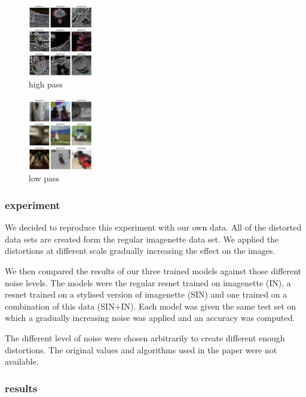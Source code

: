 \documentclass{article}
\begin{document}
\begin{figure}[h!]
\centering
\includegraphics[width = 0.25\textwidth]{imgs/image_high}
\caption{high pass}
\end{figure}

\begin{figure}[h!]
\centering
\includegraphics[width = 0.25\textwidth]{imgs/image_low}
\caption{low pass}

\end{figure}

\subsubsection{experiment}

We decided to reproduce this experiment with our own data.
All of the distorted data sets are created form the regular imagenette data set. We applied the distortions at different scale gradually increasing the effect on the images.

We then compared the results of our three trained models against those different noise levels.
The models were the regular resnet trained on imagenette (IN), a resnet trained on a stylised version of imagenette (SIN) and one trained on a combination of this data (SIN+IN).
Each model was given the same test set on which a gradually increasing noise was applied and an accuracy was computed.

The different level of noise were chosen arbitrarily to create different enough distortions. The original values and algorithms used in the paper were not available.

\subsubsection{results}
\end{document}
